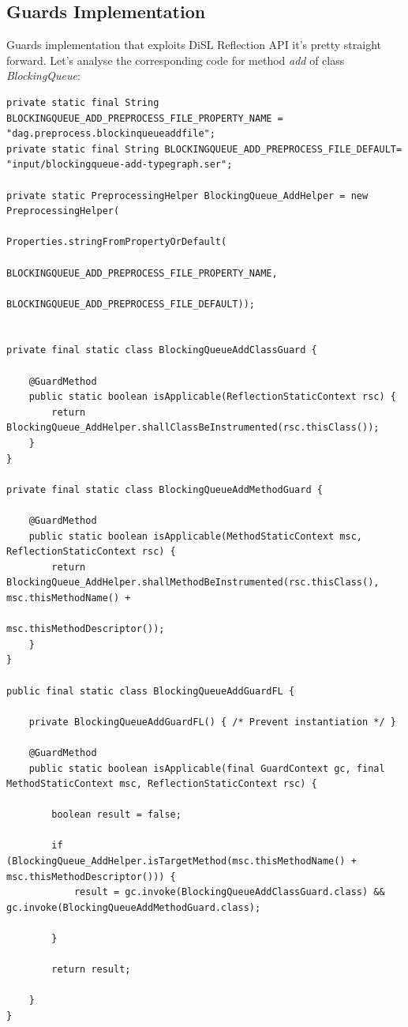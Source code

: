 \documentclass[]{usiinfthesis}
\begin{document}
 
\subsection{Guards Implementation}
Guards implementation that exploits DiSL Reflection API it's pretty straight forward. Let's analyse the corresponding code for method \textit{add} of class \textit{BlockingQueue}:

\vspace*{0.5cm}
\begin{verbatim}
private static final String BLOCKINGQUEUE_ADD_PREPROCESS_FILE_PROPERTY_NAME = "dag.preprocess.blockinqueueaddfile";
private static final String BLOCKINGQUEUE_ADD_PREPROCESS_FILE_DEFAULT= "input/blockingqueue-add-typegraph.ser";

private static PreprocessingHelper BlockingQueue_AddHelper = new PreprocessingHelper(
                                                            Properties.stringFromPropertyOrDefault(
                                                                    BLOCKINGQUEUE_ADD_PREPROCESS_FILE_PROPERTY_NAME,
                                                                    BLOCKINGQUEUE_ADD_PREPROCESS_FILE_DEFAULT));


private final static class BlockingQueueAddClassGuard {

    @GuardMethod
    public static boolean isApplicable(ReflectionStaticContext rsc) {
        return BlockingQueue_AddHelper.shallClassBeInstrumented(rsc.thisClass());
    }
}

private final static class BlockingQueueAddMethodGuard {

    @GuardMethod
    public static boolean isApplicable(MethodStaticContext msc, ReflectionStaticContext rsc) {
        return BlockingQueue_AddHelper.shallMethodBeInstrumented(rsc.thisClass(), msc.thisMethodName() +
                                                                      msc.thisMethodDescriptor());
    }
}

public final static class BlockingQueueAddGuardFL {

    private BlockingQueueAddGuardFL() { /* Prevent instantiation */ }

    @GuardMethod
    public static boolean isApplicable(final GuardContext gc, final MethodStaticContext msc, ReflectionStaticContext rsc) {

        boolean result = false;

        if (BlockingQueue_AddHelper.isTargetMethod(msc.thisMethodName() + msc.thisMethodDescriptor())) {
            result = gc.invoke(BlockingQueueAddClassGuard.class) && gc.invoke(BlockingQueueAddMethodGuard.class);

        }

        return result;

    }
}
\end{verbatim}
\vspace*{0.5cm}
 
\end{document}

